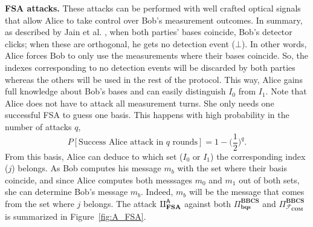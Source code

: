\noindent\textbf{FSA attacks.} These attacks can be performed with well crafted optical signals that allow Alice to take control over Bob's measurement outcomes. In summary, as described by Jain et al. \cite{JSKEML16}, when both parties' bases coincide, Bob's detector clicks; when these are orthogonal, he gets no detection event ($\bot$). In other words, Alice forces Bob to only use the measurements where their bases coincide. So, the indexes corresponding to no detection events will be discarded by both parties whereas the others will be used in the rest of the protocol. This way, Alice gains full knowledge about Bob's bases and can easily distinguish $I_0$ from $I_1$. Note that Alice does not have to attack all measurement turns. She only needs one successful FSA to guess one basis. This happens with high probability in the number of attacks $q$,
$$P[\text{Success Alice attack in }q\text{ rounds} ] = 1 - \bigg(\frac{1}{2}\bigg)^q.$$
From this basis, Alice can deduce to which set ($I_0$ or $I_1$) the corresponding index ($j$) belongs. As Bob computes his message $m_b$ with the set where their basis coincide, and since Alice computes both messsages $m_0$ and $m_1$ out of both sets, she can determine Bob's message $m_b$. Indeed, $m_b$ will be the message that comes from the set where $j$ belongs. The attack $\rotPi^{\mathsf{A}}_{\textbf{FSA}}$ against both $\Pi^{\textbf{BBCS}}_{\textbf{bqs}}$ and $\Pi^{\textbf{BBCS}}_{\mathcal{F}_\textbf{COM}}$ is summarized in Figure~\ref{fig:A_FSA}.

